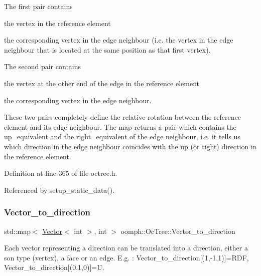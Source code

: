 \begin{DoxyItemize}
\item The first pair contains
\begin{DoxyEnumerate}
\item the vertex in the reference element
\item the corresponding vertex in the edge neighbour (i.\+e. the vertex in the edge neighbour that is located at the same position as that first vertex).
\end{DoxyEnumerate}
\item The second pair contains
\begin{DoxyEnumerate}
\item the vertex at the other end of the edge in the reference element
\item the corresponding vertex in the edge neighbour.
\end{DoxyEnumerate}
\end{DoxyItemize}These two pairs completely define the relative rotation between the reference element and its edge neighbour. The map returns a pair which contains the up\+\_\+equivalent and the right\+\_\+equivalent of the edge neighbour, i.\+e. it tells us which direction in the edge neighbour coincides with the up (or right) direction in the reference element. 

Definition at line 365 of file octree.\+h.



Referenced by setup\+\_\+static\+\_\+data().

\mbox{\label{classoomph_1_1OcTree_aec83bade91057d89aa3896274cb96b7e}} 
\subsubsection{\texorpdfstring{Vector\+\_\+to\+\_\+direction}{Vector\_to\_direction}}
{\footnotesize\ttfamily std\+::map$<$ \hyperlink{classoomph_1_1Vector}{Vector}$<$ int $>$, int $>$ oomph\+::\+Oc\+Tree\+::\+Vector\+\_\+to\+\_\+direction\hspace{0.3cm}{\ttfamily [static]}}



Each vector representing a direction can be translated into a direction, either a son type (vertex), a face or an edge. E.\+g. \+: Vector\+\_\+to\+\_\+direction\mbox{[}(1,-\/1,1)\mbox{]}=R\+DF, Vector\+\_\+to\+\_\+direction\mbox{[}(0,1,0)\mbox{]}=U. 

